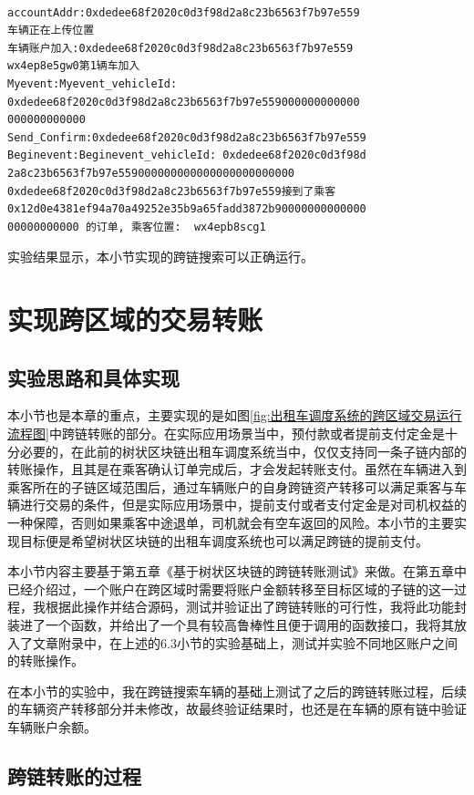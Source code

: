 \begin{verbatim}

accountAddr:0xdedee68f2020c0d3f98d2a8c23b6563f7b97e559
车辆正在上传位置
车辆账户加入:0xdedee68f2020c0d3f98d2a8c23b6563f7b97e559
wx4ep8e5gw0第1辆车加入
Myevent:Myevent_vehicleId: 
0xdedee68f2020c0d3f98d2a8c23b6563f7b97e559000000000000
000000000000
Send_Confirm:0xdedee68f2020c0d3f98d2a8c23b6563f7b97e559
Beginevent:Beginevent_vehicleId: 0xdedee68f2020c0d3f98d
2a8c23b6563f7b97e559000000000000000000000000
0xdedee68f2020c0d3f98d2a8c23b6563f7b97e559接到了乘客 
0x12d0e4381ef94a70a49252e35b9a65fadd3872b90000000000000
00000000000 的订单, 乘客位置:  wx4epb8scg1

\end{verbatim}

实验结果显示，本小节实现的跨链搜索可以正确运行。

\section{实现跨区域的交易转账}

\subsection{实验思路和具体实现}

本小节也是本章的重点，主要实现的是如图\ref{fig:出租车调度系统的跨区域交易运行流程图}中跨链转账的部分。在实际应用场景当中，预付款或者提前支付定金是十分必要的，在此前的树状区块链出租车调度系统当中，仅仅支持同一条子链内部的转账操作，且其是在乘客确认订单完成后，才会发起转账支付。虽然在车辆进入到乘客所在的子链区域范围后，通过车辆账户的自身跨链资产转移可以满足乘客与车辆进行交易的条件，但是实际应用场景中，提前支付或者支付定金是对司机权益的一种保障，否则如果乘客中途退单，司机就会有空车返回的风险。本小节的主要实现目标便是希望树状区块链的出租车调度系统也可以满足跨链的提前支付。

本小节内容主要基于第五章《基于树状区块链的跨链转账测试》来做。在第五章中已经介绍过，一个账户在跨区域时需要将账户金额转移至目标区域的子链的这一过程，我根据此操作并结合源码，测试并验证出了跨链转账的可行性，我将此功能封装进了一个函数，并给出了一个具有较高鲁棒性且便于调用的函数接口，我将其放入了文章附录中，在上述的6.3小节的实验基础上，测试并实验不同地区账户之间的转账操作。

在本小节的实验中，我在跨链搜索车辆的基础上测试了之后的跨链转账过程，后续的车辆资产转移部分并未修改，故最终验证结果时，也还是在车辆的原有链中验证车辆账户余额。

\subsection{跨链转账的过程}

